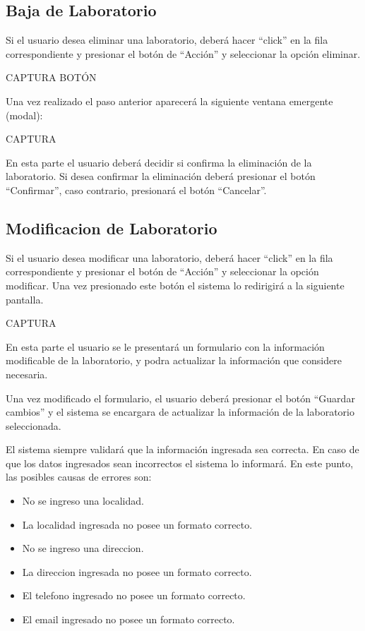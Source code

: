 \documentclass[letterpaper,10pt,spanish]{sphinxmanual}
\begin{document}
\subsection{Baja de Laboratorio}
\label{laboratorios:baja-de-laboratorio}
Si el usuario desea eliminar una laboratorio, deberá hacer “click” en la fila correspondiente y presionar el botón de “Acción” y seleccionar la opción eliminar.

CAPTURA BOTÓN

Una vez realizado el paso anterior aparecerá la siguiente ventana emergente (modal):

CAPTURA

En esta parte el usuario deberá decidir si confirma la eliminación de la laboratorio. Si desea confirmar la eliminación deberá presionar el botón “Confirmar”, caso contrario, presionará el botón “Cancelar”.


\subsection{Modificacion de Laboratorio}
\label{laboratorios:modificacion-de-laboratorio}
Si el usuario desea modificar una laboratorio, deberá hacer “click” en la fila correspondiente y presionar el botón de “Acción” y seleccionar la opción modificar.
Una vez presionado este botón el sistema lo redirigirá a la siguiente pantalla.

CAPTURA

En esta parte el usuario se le presentará un formulario con la información modificable de la laboratorio, y podra actualizar la información que considere necesaria.

Una vez modificado el formulario, el usuario deberá presionar el botón “Guardar cambios” y el sistema se encargara de actualizar la información de la laboratorio seleccionada.

El sistema siempre validará que la información ingresada sea correcta. En caso de que los datos ingresados sean incorrectos el sistema lo informará.
En este punto, las posibles causas de errores son:
\begin{itemize}
\item {} 
No se ingreso una localidad.

\item {} 
La localidad ingresada no posee un formato correcto.

\item {} 
No se ingreso una direccion.

\item {} 
La direccion ingresada no posee un formato correcto.

\item {} 
El telefono ingresado no posee un formato correcto.

\item {} 
El email ingresado no posee un formato correcto.

\end{itemize}
\end{document}
